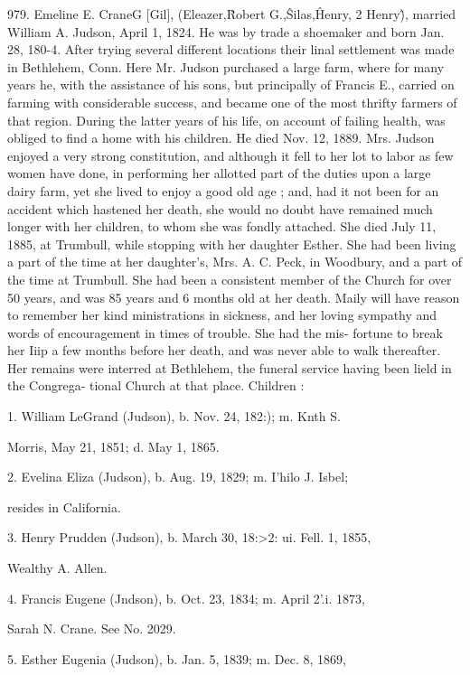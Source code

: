 979. Emeline E. CraneG [Gil], (Eleazer,\^ Robert G.,\^ Silas,\^ 
Henry, 2 Henry\^), married William A. Judson, April 1, 1824. 
He was by trade a shoemaker and born Jan. 28, 180-4. After 
trying several different locations their linal settlement was made 
in Bethlehem, Conn. Here Mr. Judson purchased a large farm, 
where for many years he, with the assistance of his sons, but 
principally of Francis E., carried on farming with considerable 
success, and became one of the most thrifty farmers of that 
region. During the latter years of his life, on account of failing 
health, was obliged to find a home with his children. He died 
Nov. 12, 1889. Mrs. Judson enjoyed a very strong constitution, 
and although it fell to her lot to labor as few women have done, 
in performing her allotted part of the duties upon a large dairy 
farm, yet she lived to enjoy a good old age ; and, had it not been 
for an accident which hastened her death, she would no doubt 
have remained much longer with her children, to whom she was 
fondly attached. She died July 11, 1885, at Trumbull, while 
stopping with her daughter Esther. She had been living a part 
of the time at her daughter's, Mrs. A. C. Peck, in Woodbury, 
and a part of the time at Trumbull. She had been a consistent 
member of the Church for over 50 years, and was 85 years and 
6 months old at her death. Maily will have reason to remember 
her kind ministrations in sickness, and her loving sympathy and 
words of encouragement in times of trouble. She had the mis- 
fortune to break her Iiip a few months before her death, and was 
never able to walk thereafter. Her remains were interred at 
Bethlehem, the funeral service having been lield in the Congrega- 
tional Church at that place. Children : 

1. William LeGrand (Judson), b. Nov. 24, 182:); m. Knth S. 

Morris, May 21, 1851; d. May 1, 1865. 

2. Evelina Eliza (Judson), b. Aug. 19, 1829; m. I'hilo J. Isbel; 

resides in California. 

3. Henry Prudden (Judson), b. March 30, 18:>2: ui. Fell. 1, 1855, 

Wealthy A. Allen. 

4. Francis Eugene (Jndson), b. Oct. 23, 1834; m. April 2'.i. 1873, 

Sarah N. Crane. See No. 2029. 

5. Esther Eugenia (Judson), b. Jan. 5, 1839; m. Dec. 8, 1869, 

